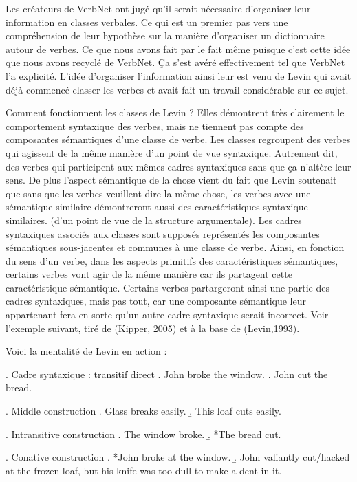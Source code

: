 Les créateurs de VerbNet ont jugé qu'il serait nécessaire d'organiser leur information en classes verbales. Ce qui est un premier pas vers une compréhension de leur hypothèse sur la manière d'organiser un dictionnaire autour de verbes. Ce que nous avons fait par le fait même puisque c'est cette idée que nous avons recyclé de VerbNet. Ça s'est avéré effectivement tel que VerbNet l'a explicité. L'idée d'organiser l'information ainsi leur est venu de Levin qui avait déjà commencé classer les verbes et avait fait un travail considérable sur ce sujet. 

Comment fonctionnent les classes de Levin ? Elles démontrent très clairement le comportement syntaxique des verbes, mais ne tiennent pas compte des composantes sémantiques d'une classe de verbe. Les classes regroupent des verbes qui agissent de la même manière d'un point de vue syntaxique. Autrement dit, des verbes qui participent aux mêmes cadres syntaxiques sans que ça n'altère leur sens. De plus l'aspect sémantique de la chose vient du fait que Levin soutenait que sans que les verbes veuillent dire la même chose, les verbes avec une sémantique similaire démontreront aussi des caractéristiques syntaxique similaires. (d'un point de vue de la structure argumentale). Les cadres syntaxiques associés aux classes sont supposés représentés les composantes sémantiques sous-jacentes et communes à une classe de verbe. Ainsi, en fonction du sens d'un verbe, dans les aspects primitifs des caractéristiques sémantiques, certains verbes vont agir de la même manière car ils partagent cette caractéristique sémantique. Certains verbes partargeront ainsi une partie des cadres syntaxiques, mais pas tout, car une composante sémantique leur appartenant fera en sorte qu'un autre cadre syntaxique serait incorrect. Voir l'exemple suivant, tiré de (Kipper, 2005) et à la base de (Levin,1993). 

Voici la mentalité de Levin en action :

\ex. \label{transitive} Cadre syntaxique : transitif direct
	\a. John broke the window.
	\b. John cut the bread.
	
\ex. \label{middle} Middle construction
	\a. Glass breaks easily.
	\b. This loaf cuts easily.
	
\ex. \label{intransitive} Intransitive construction
	\a. The window broke.
	\b. *The bread cut.

\ex. \label{conative} Conative construction
	\a. *John broke at the window.
	\b. John valiantly cut/hacked at the frozen loaf, but his knife was too dull to make a dent in it.

